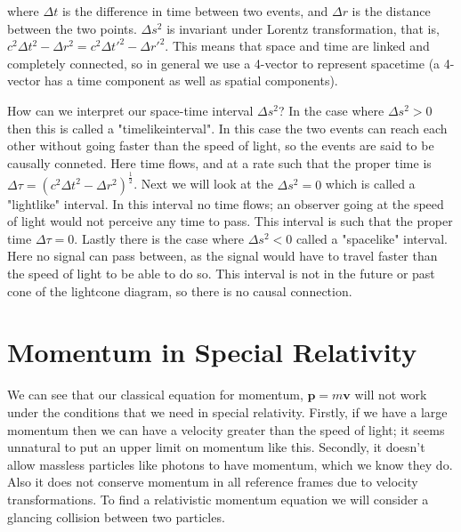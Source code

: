 \documentclass[11pt]{amsart}
\begin{document}
where $\Delta t$ is the difference in time between two events, and $\Delta r$ is the distance between the two points. $\Delta s^2$ is invariant under Lorentz transformation, that is, $c^2 \Delta t^2 - \Delta r^2 = c^2 \Delta t'^2 - \Delta r'^2$. This means that space and time are linked and completely connected, so in general we use a 4-vector to represent spacetime (a 4-vector has a time component as well as spatial components).

How can we interpret our space-time interval $\Delta s^2$? In the case where $\Delta s^2 > 0$ then this is called a "timelikeinterval". In this case the two events can reach each other without going faster than the speed of light, so the events are said to be causally conneted. Here time flows, and at a rate such that the proper time is $\Delta \tau = \left(c^2 \Delta t^2 - \Delta r^2\right)^{\frac{1}{2}}$. Next we will look at the $\Delta s^2 = 0$ which is called a "lightlike"
interval. In this interval no time flows; an observer going at the speed of light would not perceive any time to pass. This interval is such that the proper time $\Delta \tau = 0$. Lastly there is the case where $\Delta s^2 < 0$ called a "spacelike" interval. Here no signal can pass between, as the signal would have to travel faster than the speed of light to be able to do so. This interval is not in the future or past cone of the lightcone diagram, so there is no causal connection.

\section{Momentum in Special Relativity}

We can see that our classical equation for momentum, $\mathbf{p} = m\mathbf{v}$ will not work under the conditions that we need in special relativity. Firstly, if we have a large momentum then we can have a velocity greater than the speed of light; it seems unnatural to put an upper limit on momentum like this. Secondly, it doesn't allow massless particles like photons to have momentum, which we know they do. Also it does not conserve momentum in all reference frames due to velocity transformations. To find a relativistic momentum equation we will consider a glancing collision between two particles.
\end{document}
